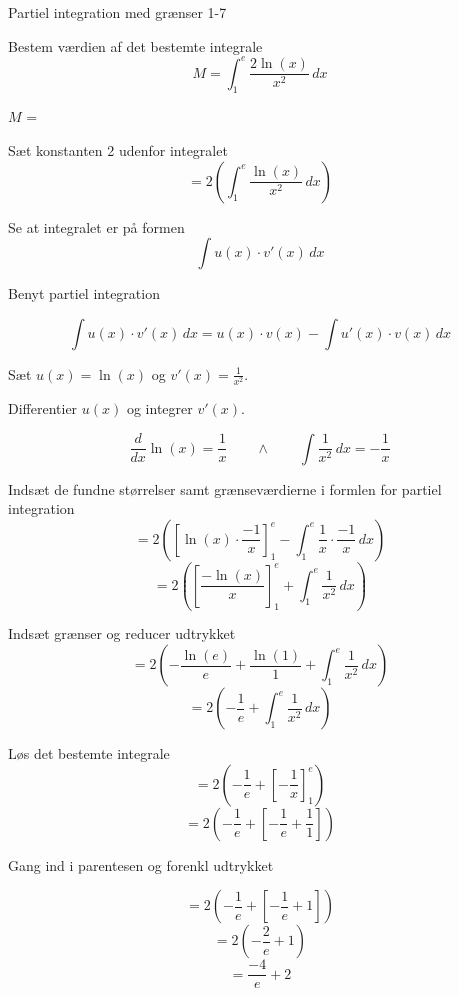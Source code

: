 \documentclass{article}
\begin{document}
\begin{exercise}{Partiel integration med grænser 1-7}
	
	
	Bestem værdien af det bestemte integrale
	\[
	M = \int_1^e \frac{2 \ln(x)}{x^2}  \, dx
	\]
	
	$M$ =  
	
	\hint
	Sæt konstanten 2 udenfor integralet
	\[
	= 2 \left( \int_1^e \frac{\ln(x)}{x^2}  \, dx	\right)
	\]
	
	\hint
	
	Se at integralet er på formen
	\[
	\int u(x) \cdot v'(x) \, dx
	\]
	
	\hint
	
	Benyt partiel integration
	
	\hint
	\[
	\int u(x) \cdot v'(x)\, dx = u(x) \cdot v(x) - \int u'(x) \cdot v(x) \, dx
	\]
	\hint
	
	Sæt $u(x) = \ln(x)$ og $v'(x) = \frac{1}{x^2}$.
	
	
	\hint
	
	Differentier $u(x)$ og integrer $v'(x)$.
	
	\hint
	\[
	\frac{d}{dx} \ln(x) = \frac{1}{x} \qquad \wedge \qquad \int \frac{1}{x^2} \, dx = - \frac{1}{x}
	\]
	
	\hint
	
	Indsæt de fundne størrelser samt grænseværdierne i formlen for partiel integration 
	\[
	= 2 \left( \left[\ln(x) \cdot \frac{-1}{x} \right]_{1}^{e} - \int_{1}^{e} \frac{1}{x} \cdot \frac{-1}{x} \, dx \right) 
	\]
	\[
	=2 \left( \left[\frac{-\ln(x)}{x} \right]_{1}^{e} + \int_{1}^{e} \frac{1}{x^2} \, dx \right)
	\]
	
	\hint
	
	Indsæt grænser og reducer udtrykket
	\[
	= 2 \left( -\frac{\ln(e)}{e} +\frac{\ln(1)}{1}  + \int_{1}^{e} \frac{1}{x^2} \, dx \right)
	\]
	\[
	= 2 \left( -\frac{1}{e}  + \int_{1}^{e} \frac{1}{x^2} \, dx \right)
	\]
	
	\hint
	Løs det bestemte integrale
	\[
	= 2 \left( -\frac{1}{e}  + \left[- \frac{1}{x}	\right]_1^e	\right) 
	\]
	\[
	=  2 \left( -\frac{1}{e}  + \left[- \frac{1}{e} + \frac{1}{1}	\right]\right) 
	\]
	
	\hint
	Gang ind i parentesen og forenkl udtrykket
	
	\hint
	\[
	=  2 \left( -\frac{1}{e}  + \left[- \frac{1}{e} +  1	\right]\right) 
	\]
	\[
	= 2 \left( -\frac{2}{e} +  1\right) 
	\]
	\[
	= \frac{-4}{e} + 2 
	\]
	
	
	
\end{exercise}
\end{document}

